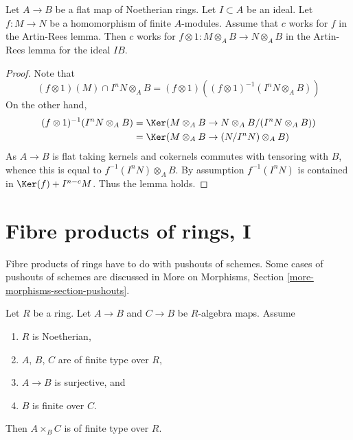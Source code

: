 \begin{lemma}
\label{lemma-works-flat-extension}
Let $A \to B$ be a flat map of Noetherian rings. Let $I \subset A$ be
an ideal. Let $f : M \to N$ be a homomorphism of finite $A$-modules.
Assume that $c$ works for $f$ in the Artin-Rees lemma. Then $c$ works for
$f \otimes 1 : M \otimes_A B \to N \otimes_A B$ in the Artin-Rees lemma
for the ideal $IB$.
\end{lemma}

\begin{proof}
Note that
$$
(f \otimes 1)(M) \cap I^n N \otimes_A B
= (f \otimes 1)\left((f \otimes 1)^{-1}(I^n N \otimes_A B)\right)
$$
On the other hand,
\begin{align*}
(f \otimes 1)^{-1}(I^n N \otimes_A B) &
= \Ker(M \otimes_A B \to N \otimes_A B/(I^n N \otimes_A B)) \\
& =
\Ker(M \otimes_A B \to (N/I^nN) \otimes_A B)
\end{align*}
As $A \to B$ is flat taking kernels and cokernels commutes with
tensoring with $B$, whence this is equal to
$f^{-1}(I^nN) \otimes_A B$. By assumption $f^{-1}(I^nN)$ is contained in
$\Ker(f) + I^{n - c}M$. Thus the lemma holds.
\end{proof}








\section{Fibre products of rings, I}
\label{section-fibre-products-rings}

\noindent
Fibre products of rings have to do with pushouts of schemes. Some
cases of pushouts of schemes are discussed in
More on Morphisms, Section \ref{more-morphisms-section-pushouts}.

\begin{lemma}
\label{lemma-fibre-product-finite-type}
Let $R$ be a ring. Let $A \to B$ and $C \to B$ be $R$-algebra maps.
Assume
\begin{enumerate}
\item $R$ is Noetherian,
\item $A$, $B$, $C$ are of finite type over $R$,
\item $A \to B$ is surjective, and
\item $B$ is finite over $C$.
\end{enumerate}
Then $A \times_B C$ is of finite type over $R$.
\end{lemma}

